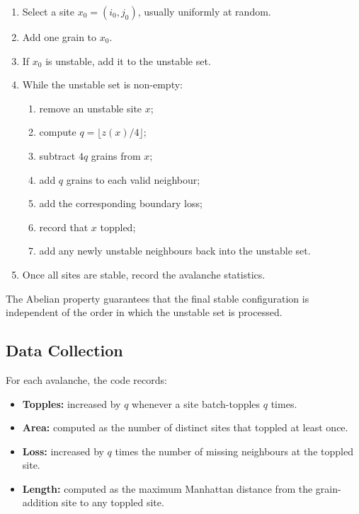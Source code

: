 \documentclass[11pt]{article}
\begin{document}
\begin{enumerate}
    \item Select a site \(x_0=(i_0,j_0)\), usually uniformly at random.
    \item Add one grain to \(x_0\).
    \item If \(x_0\) is unstable, add it to the unstable set.
    \item While the unstable set is non-empty:
    \begin{enumerate}
        \item remove an unstable site \(x\);
        \item compute \(q=\lfloor z(x)/4\rfloor\);
        \item subtract \(4q\) grains from \(x\);
        \item add \(q\) grains to each valid neighbour;
        \item add the corresponding boundary loss;
        \item record that \(x\) toppled;
        \item add any newly unstable neighbours back into the unstable set.
    \end{enumerate}
    \item Once all sites are stable, record the avalanche statistics.
\end{enumerate}

The Abelian property guarantees that the final stable configuration is independent of the order in which the unstable set is processed. 

\subsection{Data Collection}

For each avalanche, the code records:

\begin{itemize}
    \item \textbf{Topples:} increased by \(q\) whenever a site batch-topples \(q\) times.

    \item \textbf{Area:} computed as the number of distinct sites that toppled at least once.

    \item \textbf{Loss:} increased by \(q\) times the number of missing neighbours at the toppled site.

    \item \textbf{Length:} computed as the maximum Manhattan distance from the grain-addition site to any toppled site.
\end{itemize}
\end{document}
